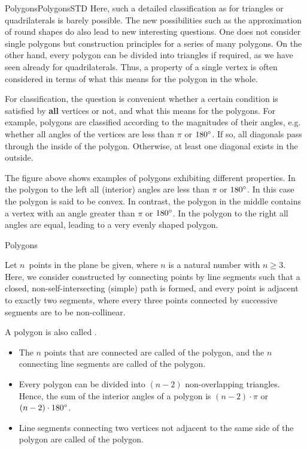 \begin{MXContent}{Polygons}{Polygons}{STD}
Here, such a detailed classification as for triangles or quadrilaterals is barely 
possible. The new possibilities such as the approximation of round shapes do also lead 
to new interesting questions. One does not consider single polygons but construction 
principles for a series of many polygons. On the other hand, every polygon can be 
divided into triangles if required, as we have seen already for quadrilaterals.
Thus, a property of a single vertex is often considered in terms of what this means
for the polygon in the whole.

For classification, the question is convenient whether a certain condition is satisfied by 
\textbf{all} vertices or not, and what this means for the polygons. For example, polygons 
are classified according to the magnitudes of their angles, e.g. whether all angles of the 
vertices are less than $\pi$ or $180^{\circ}$. If so, all diagonals pass through the inside of the polygon. 
Otherwise, at least one diagonal exists in the outside.

The figure above shows examples of polygons exhibiting different properties. 
In the polygon to the left all (interior) angles are less than $\pi$ or $180^{\circ}$. In this 
case the polygon is said to be convex. In contrast, the polygon in the middle contains a vertex 
with an angle greater than $\pi$ or $180^{\circ}$. In the polygon to the right all angles are 
equal, leading to a very evenly shaped polygon.

\begin{MXInfo}{Polygons}%

Let $n$~points in the plane be given, where $n$ is a natural number with $n \geq 3$.
Here, we consider  constructed by connecting points by 
line segments such that a closed, non-self-intersecting (simple) path is formed, and 
every point is adjacent to exactly two segments, where every three points connected 
by successive segments are to be non-collinear. 

A polygon is also called . 


\begin{itemize}
\item The $n$ points that are connected are called 
of the polygon, and the $n$ connecting line segments are called 
of the polygon.
\item Every polygon can be divided into $(n-2)$ non-overlapping triangles. Hence, the sum of the 
interior angles of a polygon is $(n-2) \cdot \pi$ or $(n-2) \cdot 180^{\circ}$.
\item Line segments connecting two vertices not adjacent to the same side of the 
polygon are called  of the polygon.
\end{itemize}
\end{MXInfo}


\end{MXContent}

